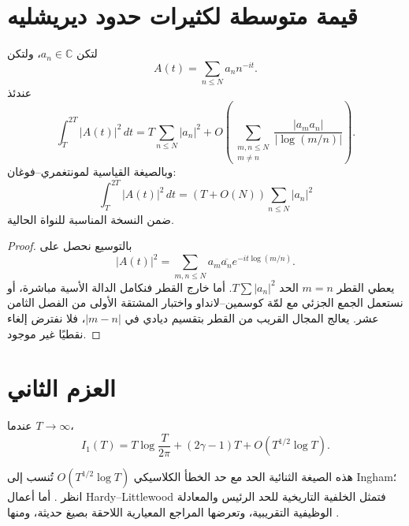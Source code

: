 \section{قيمة متوسطة لكثيرات حدود ديريشليه}

\begin{proposition}
\label{prop:ch22-dirichlet-polynomial-mean}
\provedhere
لتكن \(a_n\in\mathbb C\)، ولتكن
\[
A(t)=\sum_{n\le N}a_n n^{-it}.
\]
عندئذ
\[
\int_T^{2T}|A(t)|^2\,dt
=
T\sum_{n\le N}|a_n|^2
+O\!\left(\sum_{\substack{m,n\le N\\m\ne n}}
\frac{|a_m a_n|}{|\log(m/n)|}\right).
\]
وبالصيغة القياسية لمونتغمري--فوغان:
\[
\int_T^{2T}|A(t)|^2\,dt
=
\left(T+O(N)\right)\sum_{n\le N}|a_n|^2
\]
ضمن النسخة المناسبة للنواة الحالية.
\end{proposition}

\begin{proof}
بالتوسيع نحصل على
\[
|A(t)|^2=\sum_{m,n\le N}a_m\overline{a_n}e^{-it\log(m/n)}.
\]
يعطي القطر \(m=n\) الحد \(T\sum|a_n|^2\). أما خارج القطر فنكامل الدالة الأسية مباشرة، أو نستعمل الجمع الجزئي مع لمّة كوسمين--لانداو واختبار المشتقة الأولى من الفصل الثامن عشر. يعالج المجال القريب من القطر بتقسيم ديادي في \(|m-n|\)، فلا نفترض إلغاء نقطيًا غير موجود.
\end{proof}

\section{العزم الثاني}

\begin{theorem}
\label{thm:ch22-second-moment}
\provedhere
عندما \(T\to\infty\)،
\[
I_1(T)
=
T\log\frac{T}{2\pi}+(2\gamma-1)T
+O\!\left(T^{1/2}\log T\right).
\]
\end{theorem}

هذه الصيغة الثنائية الحد مع حد الخطأ الكلاسيكي \(O(T^{1/2}\log T)\) تُنسب إلى Ingham؛ انظر \cite{ingham1928meanvalue}. أما أعمال Hardy--Littlewood فتمثل الخلفية التاريخية للحد الرئيس والمعادلة الوظيفية التقريبية، وتعرضها المراجع المعيارية اللاحقة بصيغ حديثة، ومنها \cite{titchmarshHeathBrown1986zeta}.

